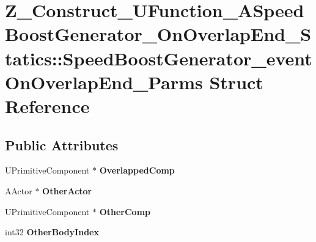 \hypertarget{struct_z___construct___u_function___a_speed_boost_generator___on_overlap_end___statics_1_1_speed3abca8d0eca565059cbc14200328307a}{}\section{Z\+\_\+\+Construct\+\_\+\+U\+Function\+\_\+\+A\+Speed\+Boost\+Generator\+\_\+\+On\+Overlap\+End\+\_\+\+Statics\+::Speed\+Boost\+Generator\+\_\+event\+On\+Overlap\+End\+\_\+\+Parms Struct Reference}
\label{struct_z___construct___u_function___a_speed_boost_generator___on_overlap_end___statics_1_1_speed3abca8d0eca565059cbc14200328307a}
\subsection*{Public Attributes}
\begin{DoxyCompactItemize}
\item 
\mbox{\label{struct_z___construct___u_function___a_speed_boost_generator___on_overlap_end___statics_1_1_speed3abca8d0eca565059cbc14200328307a_a568fd98688464c19643227a1d24c6672}} 
U\+Primitive\+Component $\ast$ {\bfseries Overlapped\+Comp}
\item 
\mbox{\label{struct_z___construct___u_function___a_speed_boost_generator___on_overlap_end___statics_1_1_speed3abca8d0eca565059cbc14200328307a_a8275820aad01457f809727e68191d220}} 
A\+Actor $\ast$ {\bfseries Other\+Actor}
\item 
\mbox{\label{struct_z___construct___u_function___a_speed_boost_generator___on_overlap_end___statics_1_1_speed3abca8d0eca565059cbc14200328307a_ab7370b5929a4fe02d2ffba67876140cf}} 
U\+Primitive\+Component $\ast$ {\bfseries Other\+Comp}
\item 
\mbox{\label{struct_z___construct___u_function___a_speed_boost_generator___on_overlap_end___statics_1_1_speed3abca8d0eca565059cbc14200328307a_a0fb069dcf42b39b0644d08a65ec0db37}} 
int32 {\bfseries Other\+Body\+Index}
\end{DoxyCompactItemize}


